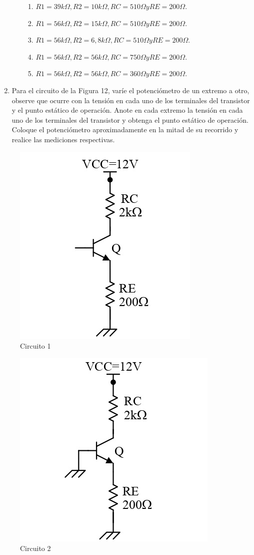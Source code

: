 \documentclass[10pt, a4paper]{article}
\begin{document}
\begin{enumerate}
\begin{enumerate}
\begin{enumerate}
                \item $R1=39k\Omega, R2=10k\Omega, RC=510\Omega y RE=200\Omega.$
                \item $R1=56k\Omega, R2=15k\Omega, RC=510\Omega y RE=200\Omega.$
                \item $R1=56k\Omega, R2=6,8k\Omega, RC=510\Omega y RE=200\Omega.$
                \item $R1=56k\Omega, R2=56k\Omega, RC=750\Omega y RE=200\Omega.$
                \item $R1=56k\Omega, R2=56k\Omega, RC=360\Omega y RE=200\Omega.$
            \end{enumerate}
        \end{enumerate}
        \item 	Para el circuito de la Figura 12, varíe el potenciómetro de un extremo a otro, observe que ocurre con la tensión en cada uno de los terminales del transistor y el punto estático de operación. Anote en cada extremo la tensión en cada uno de los terminales del transistor y obtenga el punto estático de operación. Coloque el potenciómetro aproximadamente en la mitad de su recorrido y realice las mediciones respectivas.
    \end{enumerate}

    \newpage

    \begin{figure}[h!]
        \centering
        \includegraphics[height=5cm\textwidth]{circuito1.jpg}
        \caption{\label{fig:7} Circuito 1}
    \end{figure}

    \begin{figure}[h!]
        \centering
        \includegraphics[height=5cm\textwidth]{circuito2.jpg}
        \caption{\label{fig:8} Circuito 2}
    \end{figure}
\end{document}
